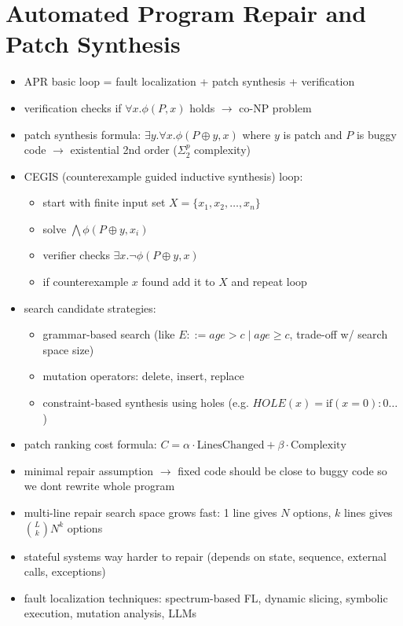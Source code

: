 \documentclass[11pt]{book}
\begin{document}
\setcounter{chapter}{6}
\chapter{Automated Program Repair and Patch Synthesis}

\begin{itemize}
\item APR basic loop = fault localization + patch synthesis + verification
\item verification checks if $\forall x.\phi(P,x)$ holds $\rightarrow$ co-NP problem
\item patch synthesis formula: $\exists y.\forall x.\phi(P\oplus y,x)$ where $y$ is patch and $P$ is buggy code $\rightarrow$ existential 2nd order ($\Sigma_2^p$ complexity)
\item CEGIS (counterexample guided inductive synthesis) loop:
\begin{itemize}
\item start with finite input set $X=\{x_1,x_2,\dots,x_n\}$
\item solve $\bigwedge \phi(P\oplus y, x_i)$
\item verifier checks $\exists x.\neg \phi(P\oplus y, x)$
\item if counterexample $x$ found add it to $X$ and repeat loop
\end{itemize}
\item search candidate strategies:
\begin{itemize}
\item grammar-based search (like $E ::= age > c \mid age \ge c$, trade-off w/ search space size)
\item mutation operators: delete, insert, replace
\item constraint-based synthesis using holes (e.g. $HOLE(x) = \text{if}(x=0):0 \dots$)
\end{itemize}
\item patch ranking cost formula: $C = \alpha \cdot \text{LinesChanged} + \beta \cdot \text{Complexity}$
\item minimal repair assumption $\rightarrow$ fixed code should be close to buggy code so we dont rewrite whole program
\item multi-line repair search space grows fast: 1 line gives $N$ options, $k$ lines gives $\binom{L}{k}N^k$ options
\item stateful systems way harder to repair (depends on state, sequence, external calls, exceptions)
\item fault localization techniques: spectrum-based FL, dynamic slicing, symbolic execution, mutation analysis, LLMs

\end{itemize}
\end{document}
